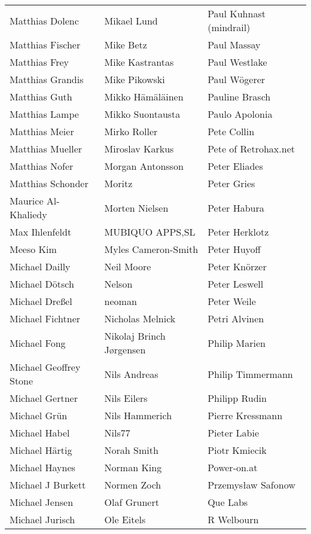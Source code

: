 \begin{small}
\begin{tabular}{p{4cm}p{4cm}p{4cm}}
\end{tabular}
\newpage
\setlength{\tabcolsep}{1mm}
\begin{tabular}{p{4cm}p{4cm}p{4cm}}
Matthias Dolenc & Mikael Lund & Paul Kuhnast (mindrail) \\
Matthias Fischer & Mike Betz & Paul Massay \\
Matthias Frey & Mike Kastrantas & Paul Westlake \\
Matthias Grandis & Mike Pikowski & Paul Wögerer \\
Matthias Guth & Mikko Hämäläinen & Pauline Brasch \\
Matthias Lampe & Mikko Suontausta & Paulo Apolonia \\
Matthias Meier & Mirko Roller & Pete Collin \\
Matthias Mueller & Miroslav Karkus & Pete of Retrohax.net \\
Matthias Nofer & Morgan Antonsson & Peter Eliades \\
Matthias Schonder & Moritz & Peter Gries \\
Maurice Al-Khaliedy & Morten Nielsen & Peter Habura \\
Max Ihlenfeldt & MUBIQUO APPS,SL & Peter Herklotz \\
Meeso Kim & Myles Cameron-Smith & Peter Huyoff \\
Michael Dailly & Neil Moore & Peter Knörzer \\
Michael Dötsch & Nelson & Peter Leswell \\
Michael Dreßel & neoman & Peter Weile \\
Michael Fichtner & Nicholas Melnick & Petri Alvinen \\
Michael Fong & Nikolaj Brinch Jørgensen & Philip Marien \\
Michael Geoffrey Stone & Nils Andreas & Philip Timmermann \\
Michael Gertner & Nils Eilers & Philipp Rudin \\
Michael Grün & Nils Hammerich & Pierre Kressmann \\
Michael Habel & Nils77 & Pieter Labie \\
Michael Härtig & Norah Smith & Piotr Kmiecik \\
Michael Haynes & Norman King & Power-on.at \\
Michael J Burkett & Normen Zoch & Przemysław Safonow \\
Michael Jensen & Olaf Grunert & Que Labs \\
Michael Jurisch & Ole Eitels & R Welbourn \\

\end{tabular}
\end{small}
